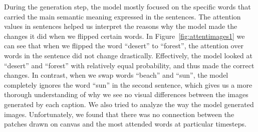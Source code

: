 \documentclass{article} %
\begin{document}

During the generation step, the model mostly focused on the specific words that carried the main semantic meaning expressed in the sentences. The attention values in sentences helped us interpret the reasons why the model made the changes it did when we flipped certain words. In Figure~\ref{fig:attentimages1} we can see that when we flipped the word ``desert'' to ``forest'', the attention over words in the sentence did not change drastically. Effectively, the model looked at ``desert'' and ``forest'' with relatively equal probability, and thus made the correct changes. In contrast, when we swap words ``beach'' and ``sun'', the model completely ignores the word ``sun'' in the second sentence, which gives us a more thorough understanding of why we see no visual differences between the images generated by each caption. We also tried to analyze the way the model generated images. Unfortunately, we found that there was no connection between the patches drawn on canvas and the most attended words at particular timesteps.

\end{document}
